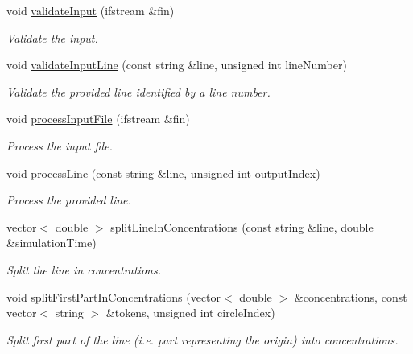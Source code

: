 \begin{DoxyCompactItemize}
void \hyperlink{classmultiscale_1_1video_1_1PolarCsvToInputFilesConverter_af612ef958fd3656f2c477d4d8e81244a}{validate\-Input} (ifstream \&fin)
\begin{DoxyCompactList}\small\item\em \-Validate the input. \end{DoxyCompactList}\item 
void \hyperlink{classmultiscale_1_1video_1_1PolarCsvToInputFilesConverter_a71741de958cfecc133a303ea3a5af22c}{validate\-Input\-Line} (const string \&line, unsigned int line\-Number)
\begin{DoxyCompactList}\small\item\em \-Validate the provided line identified by a line number. \end{DoxyCompactList}\item 
void \hyperlink{classmultiscale_1_1video_1_1PolarCsvToInputFilesConverter_a66168d7550e656dccf01a473ed2708f0}{process\-Input\-File} (ifstream \&fin)
\begin{DoxyCompactList}\small\item\em \-Process the input file. \end{DoxyCompactList}\item 
void \hyperlink{classmultiscale_1_1video_1_1PolarCsvToInputFilesConverter_a23c483d80d7c0c8f0510595a1ab55f69}{process\-Line} (const string \&line, unsigned int output\-Index)
\begin{DoxyCompactList}\small\item\em \-Process the provided line. \end{DoxyCompactList}\item 
vector$<$ double $>$ \hyperlink{classmultiscale_1_1video_1_1PolarCsvToInputFilesConverter_af2d31d32cdba42aeb5589b3faab315ad}{split\-Line\-In\-Concentrations} (const string \&line, double \&simulation\-Time)
\begin{DoxyCompactList}\small\item\em \-Split the line in concentrations. \end{DoxyCompactList}\item 
void \hyperlink{classmultiscale_1_1video_1_1PolarCsvToInputFilesConverter_a2ab8a181fa30c720d4ee87c188770bcc}{split\-First\-Part\-In\-Concentrations} (vector$<$ double $>$ \&concentrations, const vector$<$ string $>$ \&tokens, unsigned int circle\-Index)
\begin{DoxyCompactList}\small\item\em \-Split first part of the line (i.\-e. part representing the origin) into concentrations. \end{DoxyCompactList}\item 

\end{DoxyCompactItemize}
